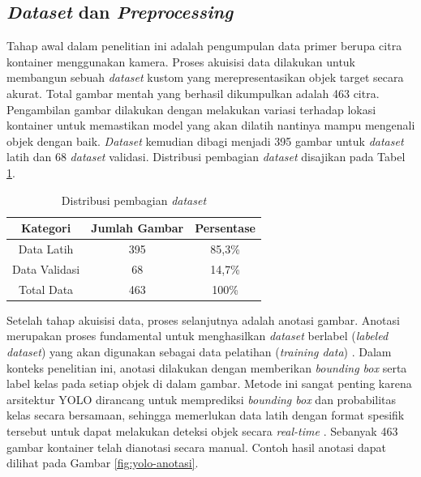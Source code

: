 \subsection{\textit{Dataset} dan \textit{Preprocessing}}
Tahap awal dalam penelitian ini adalah pengumpulan data primer berupa
citra kontainer menggunakan kamera. Proses akuisisi data dilakukan
untuk membangun sebuah \textit{dataset} kustom yang merepresentasikan objek
target secara akurat. Total gambar mentah yang berhasil dikumpulkan
adalah 463 citra. Pengambilan gambar dilakukan dengan melakukan
variasi terhadap lokasi kontainer untuk memastikan model yang akan
dilatih nantinya mampu mengenali objek dengan baik. \textit{Dataset} kemudian
dibagi menjadi 395 gambar untuk \textit{dataset} latih dan 68 \textit{dataset}
validasi. Distribusi pembagian \textit{dataset} disajikan pada Tabel
\ref{tab:pembagian-dataset}.

\begin{table}[H]
  \caption{Distribusi pembagian \textit{dataset}}
  \label{tab:pembagian-dataset}
  \vspace{-1em}
  \centering
  \begin{tabular}{ccc}
    \toprule
    \textbf{Kategori} & \textbf{Jumlah Gambar} & \textbf{Persentase} \\
    \midrule
    Data Latih & 395 & 85,3\% \\
    Data Validasi & 68 & 14,7\% \\
    Total Data & 463 & 100\% \\
    \bottomrule
  \end{tabular}
\end{table}

Setelah tahap akuisisi data, proses selanjutnya adalah anotasi
gambar. Anotasi merupakan proses fundamental untuk menghasilkan
\textit{dataset} berlabel (\textit{labeled \textit{dataset}}) yang
akan digunakan
sebagai data pelatihan (\textit{training data}) \citep{19}. Dalam
konteks penelitian
ini, anotasi dilakukan dengan memberikan \textit{bounding box} serta label
kelas pada setiap objek di dalam gambar. Metode ini sangat penting
karena arsitektur YOLO dirancang untuk memprediksi \textit{bounding box} dan
probabilitas kelas secara bersamaan, sehingga memerlukan data latih
dengan format spesifik tersebut untuk dapat melakukan deteksi objek
secara \textit{real-time} \citep{20}. Sebanyak 463 gambar kontainer
telah dianotasi
secara manual. Contoh hasil anotasi dapat dilihat pada Gambar
\ref{fig:yolo-anotasi}.

